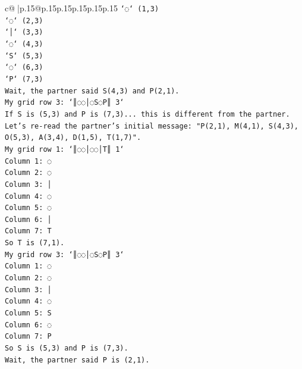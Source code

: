 \documentclass{article}
\begin{document}
{\begin{supertabular}{c@{$\;$}|p{.15\linewidth}@{}p{.15\linewidth}p{.15\linewidth}p{.15\linewidth}p{.15\linewidth}p{.15\linewidth}}
{{{\texttt{`◌` (1,3)} \\
\texttt{`◌` (2,3)} \\
\texttt{`│` (3,3)} \\
\texttt{`◌` (4,3)} \\
\texttt{`S` (5,3)} \\
\texttt{`◌` (6,3)} \\
\texttt{`P` (7,3)} \\
\texttt{Wait, the partner said S(4,3) and P(2,1).} \\
\texttt{My grid row 3: `║◌◌│◌S◌P║ 3`} \\
\texttt{If S is (5,3) and P is (7,3)... this is different from the partner.} \\
\texttt{Let's re{-}read the partner's initial message: "P(2,1), M(4,1), S(4,3), O(5,3), A(3,4), D(1,5), T(1,7)".} \\
\texttt{My grid row 1: `║◌◌│◌◌│T║ 1`} \\
\texttt{Column 1: ◌} \\
\texttt{Column 2: ◌} \\
\texttt{Column 3: │} \\
\texttt{Column 4: ◌} \\
\texttt{Column 5: ◌} \\
\texttt{Column 6: │} \\
\texttt{Column 7: T} \\
\texttt{So T is (7,1).} \\
\texttt{My grid row 3: `║◌◌│◌S◌P║ 3`} \\
\texttt{Column 1: ◌} \\
\texttt{Column 2: ◌} \\
\texttt{Column 3: │} \\
\texttt{Column 4: ◌} \\
\texttt{Column 5: S} \\
\texttt{Column 6: ◌} \\
\texttt{Column 7: P} \\
\texttt{So S is (5,3) and P is (7,3).} \\
\texttt{Wait, the partner said P is (2,1).} \\
            }
        }
    }
     \\ \\


\end{supertabular}}
\end{document}
